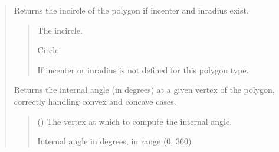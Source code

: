 \documentclass[letterpaper,10pt,english]{sphinxmanual}
\begin{document}
\begin{quote}
\begin{fulllineitems}
\begin{fulllineitems}
\end{fulllineitems}


\begin{fulllineitems}
\label{\detokenize{pygeox:pygeox.custom_objects.Polygon.incircle}}
\pysigstartsignatures
\pysigline
{}
\pysigstopsignatures
\sphinxAtStartPar
Returns the incircle of the polygon if incenter and inradius exist.
\begin{quote}\begin{description}
\sphinxAtStartPar
The incircle.

\sphinxAtStartPar
Circle

\sphinxAtStartPar
{} \textendash{} If incenter or inradius is not defined for this polygon type.

\end{description}\end{quote}

\end{fulllineitems}


\begin{fulllineitems}
\label{\detokenize{pygeox:pygeox.custom_objects.Polygon.internal_angle_at_point}}
\pysigstartsignatures
\pysiglinewithargsret
{}
{}
{}
\pysigstopsignatures
\sphinxAtStartPar
Returns the internal angle (in degrees) at a given vertex of the polygon,
correctly handling convex and concave cases.
\begin{quote}\begin{description}
\sphinxAtStartPar
{} () \textendash{} The vertex at which to compute the internal angle.

\sphinxAtStartPar
Internal angle in degrees, in range (0, 360)


\end{description}
\end{quote}
\end{fulllineitems}
\end{fulllineitems}
\end{quote}
\end{document}
